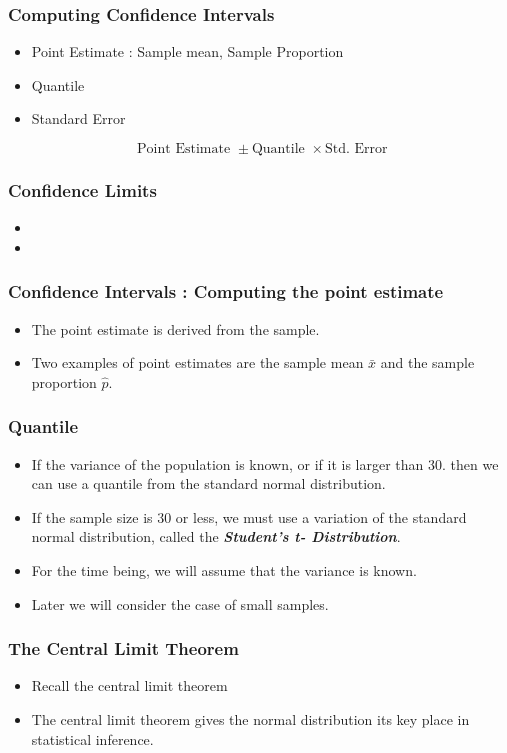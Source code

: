 \documentclass[a4]{beamer}
\begin{document}
\begin{frame}
\frametitle{Computing Confidence Intervals}
\begin{itemize}
\item Point Estimate : Sample mean, Sample Proportion
\item Quantile 
\item Standard Error
\end{itemize}
\[ \mbox{ Point Estimate } \pm \mbox{Quantile } \times \mbox{Std. Error} \]
\end{frame}
\begin{frame}
\frametitle{Confidence Limits}
\begin{itemize}
\item
\item 
\end{itemize}
\end{frame}
\begin{frame}
\frametitle{Confidence Intervals : Computing the point estimate}
\begin{itemize}
\item The point estimate is derived from the sample.
\item Two examples of point estimates are  the sample mean $\bar{x}$ and the sample proportion $\hat{p}$.
\end{itemize}
\end{frame}
\begin{frame}
\frametitle{Quantile}
\begin{itemize}
\item If the variance of the population is known, or if it is larger than 30. then we can use a quantile from the standard normal distribution.
\item If the sample size is 30 or less, we must use a variation of the standard normal distribution, called the \textbf{\emph{Student's t- Distribution}}.  
\item For the time being, we will assume that the variance is known. 
\item Later we will consider the case of small samples.
\end{itemize}
\end{frame}
\begin{frame}
\frametitle{The Central Limit Theorem}
\begin{itemize}
\item Recall the central limit theorem
\item The central limit theorem gives the normal distribution its key place in statistical inference.
\end{itemize}
\end{frame}
\end{document}
